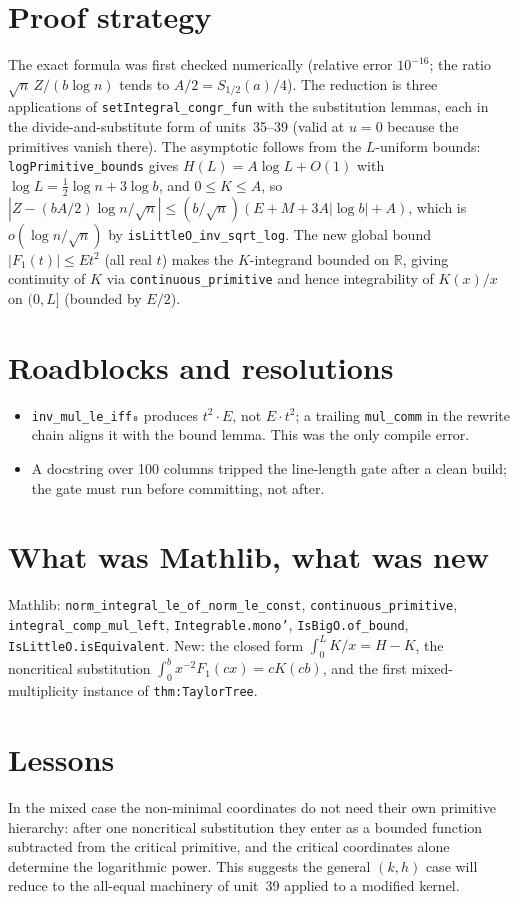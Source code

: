 \documentclass[11pt]{article}
\begin{document}
\section{Proof strategy}
The exact formula was first checked numerically (relative error $10^{-16}$; the ratio
$\sqrt n\,Z/(b\log n)$ tends to $A/2=S_{1/2}(a)/4$). The reduction is three applications of
\texttt{setIntegral\_congr\_fun} with the substitution lemmas, each in the divide-and-substitute form of
units~35--39 (valid at $u=0$ because the primitives vanish there). The asymptotic follows from the
$L$-uniform bounds: \texttt{logPrimitive\_bounds} gives $H(L)=A\log L+O(1)$ with
$\log L=\tfrac12\log n+3\log b$, and $0\le K\le A$, so
$|Z-(bA/2)\log n/\sqrt n|\le(b/\sqrt n)(E+M+3A|\log b|+A)$, which is $o(\log n/\sqrt n)$ by
\texttt{isLittleO\_inv\_sqrt\_log}. The new global bound $|F_1(t)|\le Et^2$ (all real $t$) makes the
$K$-integrand bounded on $\mathbb R$, giving continuity of $K$ via \texttt{continuous\_primitive} and
hence integrability of $K(x)/x$ on $(0,L]$ (bounded by $E/2$).

\section{Roadblocks and resolutions}
\begin{itemize}
\item \texttt{inv\_mul\_le\_iff₀} produces $t^2\cdot E$, not $E\cdot t^2$; a trailing
\texttt{mul\_comm} in the rewrite chain aligns it with the bound lemma. This was the only compile error.
\item A docstring over 100 columns tripped the line-length gate after a clean build; the gate must
run before committing, not after.
\end{itemize}

\section{What was Mathlib, what was new}
Mathlib: \texttt{norm\_integral\_le\_of\_norm\_le\_const}, \texttt{continuous\_primitive},
\texttt{integral\_comp\_mul\_left}, \texttt{Integrable.mono'}, \texttt{IsBigO.of\_bound},
\texttt{IsLittleO.isEquivalent}. New: the closed form $\int_0^LK/x=H-K$, the noncritical substitution
$\int_0^bx^{-2}F_1(cx)=cK(cb)$, and the first mixed-multiplicity instance of \texttt{thm:TaylorTree}.

\section{Lessons}
In the mixed case the non-minimal coordinates do not need their own primitive hierarchy: after one
noncritical substitution they enter as a bounded function subtracted from the critical primitive, and the
critical coordinates alone determine the logarithmic power. This suggests the general $(k,h)$ case will
reduce to the all-equal machinery of unit~39 applied to a modified kernel.
\end{document}
